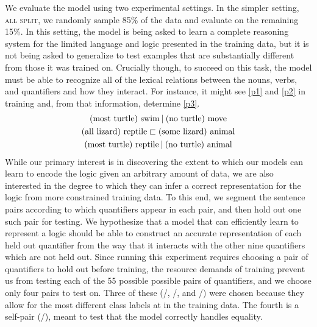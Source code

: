 We evaluate the model using two experimental settings. In the simpler
setting, \textsc{all split}, we randomly sample 85\% of the data and evaluate on the
remaining 15\%. In this setting, the model is being asked to learn a
complete reasoning system for the limited language and logic presented
in the training data, but it is not being asked to generalize to test
examples that are substantially different from those it was trained
on. Crucially though, to succeed on this task, the model must be able
to recognize all of the lexical relations between the nouns, verbs,
and quantifiers and how they interact. For instance, it might see
\eqref{p1} and \eqref{p2} in training and, from that information,
determine \eqref{p3}.
%
%
\begin{gather}
  \text{(most turtle) swim} \mathbin{|} \text{(no turtle) move}\label{p1}
  \\
  \text{(all lizard) reptile} \sqsubset  \text{(some lizard) animal}\label{p2}
  \\
  \text{(most turtle) reptile} \mathbin{|} \text{(no turtle) animal}\label{p3}
\end{gather}
%
%
While our primary interest is in discovering the extent to which our
models can learn to encode the logic given an arbitrary amount of
data, we are also interested in the degree to which they can infer a
correct representation for the logic from more constrained training
data. To this end, we segment the sentence pairs according to which
quantifiers appear in each pair, and then hold out one such pair for
testing. We hypothesize that a model that can efficiently learn to
represent a logic should be able to construct an accurate
representation of each held out quantifier from the way that it
interacts with the other nine quantifiers which are not held
out. Since running this experiment requires choosing a pair of
quantifiers to hold out before training, the resource demands of
training prevent us from testing each of the 55 possible possible
pairs of quantifiers, and we choose only four pairs to test on.  Three
of these (/, /, and
/) were chosen because they allow for the most
different class labels at in the training data. The fourth is a
self-pair (/), meant to test that the model correctly
handles equality.

